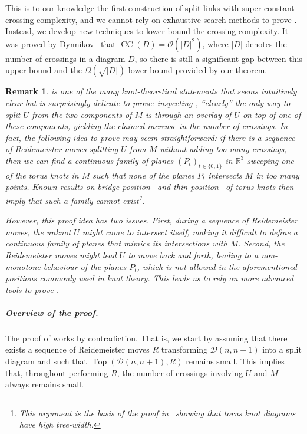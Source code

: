 \documentclass[10pt,a4paper]{amsart}
\newcommand{\addcross}{\operatorname{Top}}
\newcommand{\unlink}{\operatorname{CC}}
\newtheorem{remark}[theorem]{Remark}
\begin{document}
This is to our knowledge the first construction of split links with super-constant crossing-complexity, and we cannot rely on exhaustive search methods to prove . Instead, we develop new techniques to lower-bound the crossing-complexity. It was proved by Dynnikov~\cite[Theorem~2]{Dynnikov_arc} that $\unlink(D)= \mathcal{O}(|D|^2)$, where $|D|$ denotes the number of crossings in a diagram $D$, so there is still a significant gap between this upper bound and the $\Omega(\sqrt{|D|})$ lower bound provided by our theorem.

\begin{remark}
\label{rem:caution}
 is one of the many knot-theoretical statements that seems intuitively clear but is surprisingly delicate to prove: inspecting , ``clearly'' the only way to split $U$ from the two components of $M$ is through an overlay of $U$ on top of one of these components, yielding the claimed increase in the number of crossings. In fact, the following idea to prove  may seem straightforward: 
if there is a sequence of Reidemeister moves splitting $U$ from $M$ without adding too many crossings, then we can find a continuous family of planes $(P_t)_{t\in \{0,1\}}$ in $\mathbb{R}^3$ sweeping one of the torus knots in $M$ such that none of the planes $P_t$ intersects $M$ in too many points. Known results on \emph{bridge position}~\cite{schubert1954numerische,schultens2007bridge} and \emph{thin position}~\cite{gabai1987foliations,scharlemann2005thin} of torus knots then imply that such a family cannot exist\footnote{This argument is the basis of the proof in~\cite{Mesmay_treewidth} showing that torus knot diagrams have high tree-width.}. 

However, this proof idea has two issues. First, during a sequence of Reidemeister moves, the unknot $U$ might come to intersect itself, making it difficult to define a continuous family of planes that mimics its intersections with $M$.  Second, the Reidemeister moves might lead $U$ to move back and forth, leading to a non-monotone behaviour of the planes $P_t$, which is not allowed in the aforementioned positions commonly used in knot theory. This leads us to rely on more advanced tools to prove . 
\end{remark}

\subparagraph*{Overview of the proof.} The proof of  works by contradiction. That is, we start by assuming that there exists a sequence of Reidemeister moves $R$ transforming $\mathcal{D}(n,n+1)$ into a split diagram and such that $\addcross(\mathcal{D}(n,n+1),R)$ remains small. This implies that, throughout performing $R$, the number of crossings involving $U$ and $M$ always remains small. 
\end{document}
